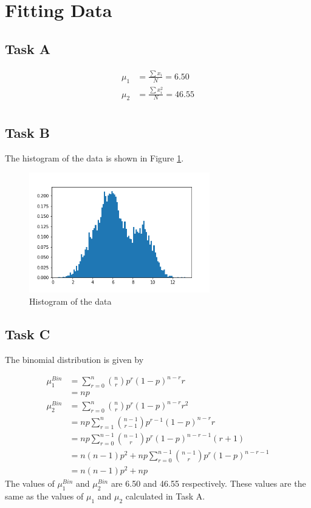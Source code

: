\section{Fitting Data}

\subsection{Task A}

\begin{align*}
    \mu_1 &= \frac{\sum x_i}{N} = 6.50 \\
    \mu_2 &= \frac{\sum x_i^2}{N} = 46.55 \\
\end{align*}

\subsection{Task B}

The histogram of the data is shown in Figure \ref{fig:q3_hist}.

\begin{figure}[H]
    \centering
    \includegraphics[width=0.7\textwidth]{images/3b.png}
    \caption{Histogram of the data}
    \label{fig:q3_hist}
\end{figure}

\subsection{Task C}

The binomial distribution is given by

\begin{align*}
    \mu_1^{Bin} &= \sum_{r=0}^{n} \binom{n}{r}p^r (1-p)^{n-r} r\\
    &= np\\
    \mu_2^{Bin} &= \sum_{r=0}^{n} \binom{n}{r}p^r (1-p)^{n-r} r^2\\
    &= np\sum_{r=1}^{n} \binom{n-1}{r-1}p^{r-1} (1-p)^{n-r} r\\
    &= np\sum_{r=0}^{n-1} \binom{n-1}{r}p^{r} (1-p)^{n-r-1} (r+1)\\
    &= n(n-1)p^2 + np\sum_{r=0}^{n-1} \binom{n-1}{r}p^{r} (1-p)^{n-r-1}\\
    &= n(n-1)p^2 + np
\end{align*}
The values of $\mu_1^{Bin}$ and $\mu_2^{Bin}$ are 6.50 and 46.55 respectively. These values are the same as the values of $\mu_1$ and $\mu_2$ calculated in Task A.

